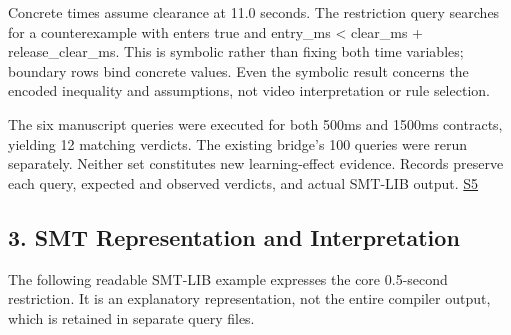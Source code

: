 \documentclass[11pt,a4paper]{article}
\begin{document}
Concrete times assume clearance at 11.0 seconds. The restriction query searches for a counterexample with {\ttfamily\small enters} true and {\ttfamily\small entry\_ms < clear\_ms + release\_clear\_ms}. This is symbolic rather than fixing both time variables; boundary rows bind concrete values. Even the symbolic result concerns the encoded inequality and assumptions, not video interpretation or rule selection.\par

The six manuscript queries were executed for both 500ms and 1500ms contracts, yielding 12 matching verdicts. The existing bridge's 100 queries were rerun separately. Neither set constitutes new learning-effect evidence. Records preserve each query, expected and observed verdicts, and actual SMT-LIB output. \href{\detokenize{../methodology-2026-09-30-001/manuscript_examples.json}}{S5}\par

\subsection*{3. SMT Representation and Interpretation}

The following readable SMT-LIB example expresses the core 0.5-second restriction. It is an explanatory representation, not the entire compiler output, which is retained in separate query files.\par
\end{document}
